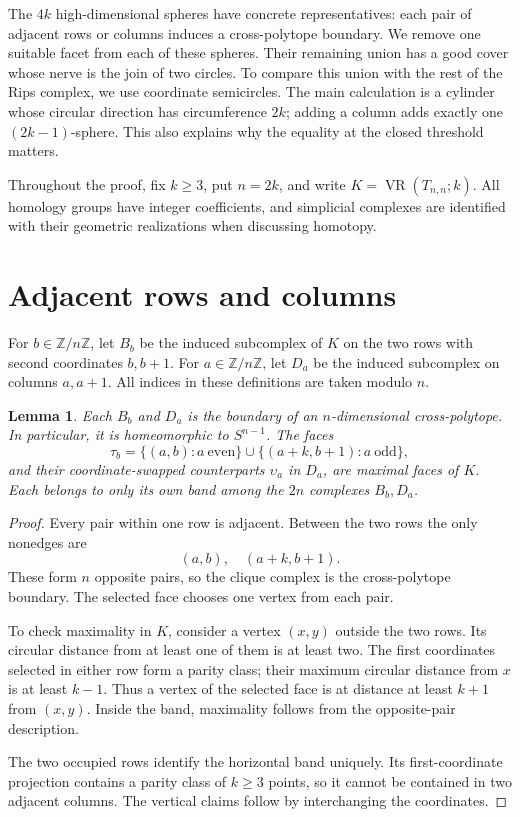 \documentclass[11pt]{amsart}
\newtheorem{lemma}[theorem]{Lemma}
\newcommand{\VR}{\operatorname{VR}}
\newcommand{\ZZ}{\mathbb Z}
\begin{document}
The \(4k\) high-dimensional spheres have concrete representatives:
each pair of adjacent rows or columns induces a cross-polytope boundary.
We remove one suitable facet from each of these spheres. Their remaining
union has a good cover whose nerve is the join of two circles. To compare
this union with the rest of the Rips complex, we use coordinate
semicircles. The main calculation is a cylinder whose circular direction
has circumference \(2k\); adding a column adds exactly one
\((2k-1)\)-sphere. This also explains why the equality at the closed
threshold matters.

Throughout the proof, fix \(k\geq3\), put \(n=2k\), and write
\(K=\VR(T_{n,n};k)\). All homology groups have integer coefficients,
and simplicial complexes are identified with their geometric realizations
when discussing homotopy.

\section{Adjacent rows and columns}

For \(b\in\ZZ/n\ZZ\), let \(B_b\) be the induced subcomplex of \(K\) on the
two rows with second coordinates \(b,b+1\). For \(a\in\ZZ/n\ZZ\), let
\(D_a\) be the induced subcomplex on columns \(a,a+1\).
All indices in these definitions are taken modulo \(n\).

\begin{lemma}\label{lem:bands}
Each \(B_b\) and \(D_a\) is the boundary of an \(n\)-dimensional
cross-polytope. In particular, it is homeomorphic to \(S^{n-1}\).
The faces
\[
\tau_b=\{(a,b):a\ \text{even}\}
       \cup\{(a+k,b+1):a\ \text{odd}\},
\]
and their coordinate-swapped counterparts \(\upsilon_a\) in \(D_a\),
are maximal faces of \(K\). Each belongs to only its own band among the
\(2n\) complexes \(B_b,D_a\).
\end{lemma}

\begin{proof}
Every pair within one row is adjacent. Between the two rows the only
nonedges are
\[
(a,b),\quad (a+k,b+1).
\]
These form \(n\) opposite pairs, so the clique complex is the
cross-polytope boundary. The selected face chooses one vertex from each
pair.

To check maximality in \(K\), consider a vertex \((x,y)\) outside the
two rows. Its circular distance from at least one of them is at least
two. The first coordinates selected in either row form a parity class;
their maximum circular distance from \(x\) is at least \(k-1\).
Thus a vertex of the selected face is at distance at least \(k+1\)
from \((x,y)\). Inside the band, maximality follows from the opposite-pair
description.

The two occupied rows identify the horizontal band uniquely. Its
first-coordinate projection contains a parity class of \(k\geq3\)
points, so it cannot be contained in two adjacent columns. The vertical
claims follow by interchanging the coordinates.
\end{proof}
\end{document}

